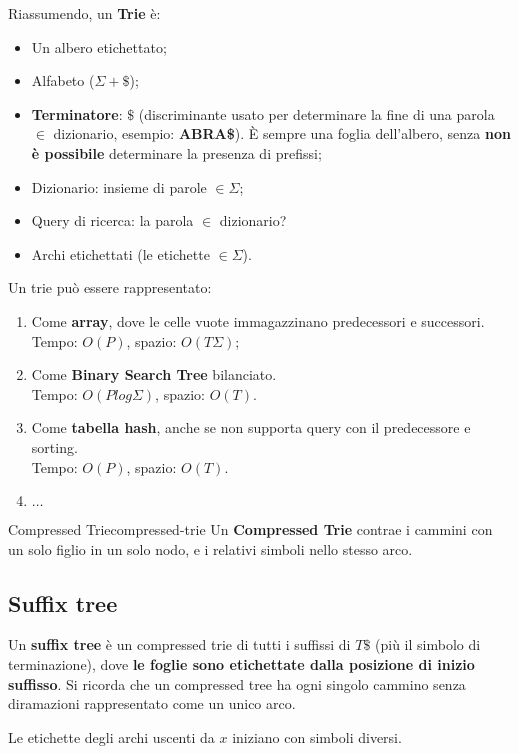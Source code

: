 Riassumendo, un \textbf{Trie} è:
\begin{itemize}
	\item Un albero etichettato;
	\item Alfabeto ($\Sigma + {\$}$);
	\item \textbf{Terminatore}: $\$$ (discriminante usato per determinare la fine di una parola $\in$ dizionario, esempio: \textbf{ABRA\$}). È sempre una foglia dell'albero, senza \textbf{non è possibile} determinare la presenza di prefissi;
	\item Dizionario: insieme di parole $\in \Sigma$;
	\item Query di ricerca: la parola $\in$ dizionario?
	\item Archi etichettati (le etichette $\in \Sigma$).
\end{itemize}

\newpage
Un trie può essere rappresentato:
\begin{enumerate}
	\item Come \textbf{array}, dove le celle vuote immagazzinano predecessori e successori. \\ 
	Tempo: $O(P)$, spazio: $O(T\Sigma)$;
	\item Come \textbf{Binary Search Tree} bilanciato. \\ 
	Tempo: $O(P log\Sigma)$, spazio: $O(T)$.
	\item Come \textbf{tabella hash}, anche se non supporta query con il predecessore e sorting. \\
	Tempo: $O(P)$, spazio: $O(T)$.
	\item $\dots$
\end{enumerate}
\smallskip
\begin{definition}{Compressed Trie}{compressed-trie}
	Un \textbf{Compressed Trie} contrae i cammini con un solo figlio in un solo nodo, e i relativi simboli nello stesso arco.
\end{definition}

\subsection{Suffix tree}
Un \textbf{suffix tree} è un compressed trie di tutti i suffissi di $T\$$ (più il simbolo di terminazione), dove \textbf{le foglie sono etichettate dalla posizione di inizio suffisso}. Si ricorda che un compressed tree ha ogni singolo cammino senza diramazioni rappresentato come un unico arco.

Le etichette degli archi uscenti da $x$ iniziano con simboli diversi.

